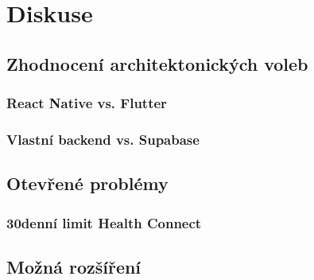 \chapter{Diskuse}

\section{Zhodnocení architektonických voleb}

\subsection{React Native vs. Flutter}

\subsection{Vlastní backend vs. Supabase}

\section{Otevřené problémy}

\subsection{30denní limit Health Connect}

\section{Možná rozšíření}